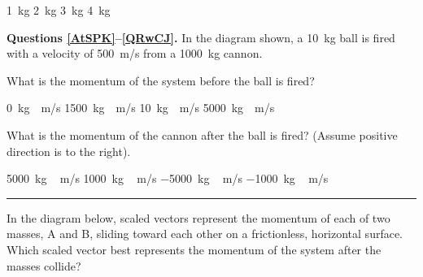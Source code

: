 \documentclass[]{exam}
\begin{document}
\begin{questions}
\begin{randomizechoices}[norandomize]
    \choice \SI{1}{kg}
    \choice \SI{2}{kg}
    \choice \SI{3}{kg}
    \correctchoice \SI{4}{kg}
\end{randomizechoices}


\begin{EnvUplevel}
\textbf{Questions \ref{AtSPK}--\ref{QRwCJ}.} In the diagram shown, a \SI{10}{kg} ball is fired with a velocity of \SI{500}{m/s} from a \SI{1000}{kg} cannon. 
\end{EnvUplevel}

\begin{center}
\end{center}

\question \label{AtSPK}
What is the momentum of the system before the ball is fired?

\begin{randomizechoices}[norandomize]
    \correctchoice \SI{0}{kg\cdot m/s}
    \choice \SI{1500}{kg\cdot m/s}
    \choice \SI{10}{kg\cdot m/s}
    \choice \SI{5000}{kg\cdot m/s}
\end{randomizechoices}

\question \label{QRwCJ}
What is the momentum of the cannon after the ball is fired? (Assume positive direction is to the right).

\begin{randomizechoices}[norandomize]
    \choice \SI{5000}{kg\,m/s}
    \choice \SI{1000}{kg\,m/s}
    \correctchoice \SI{-5000}{kg\,m/s}
    \choice \SI{-1000}{kg\,m/s}
\end{randomizechoices}

\clearpage

\hrule

\question
In the diagram below, scaled vectors represent the momentum of each of two masses, A and B, sliding toward each other on a frictionless, horizontal surface. Which scaled vector best represents the momentum of the system after the masses collide?

\begin{center}
\end{center}


\end{questions}
\end{document}
